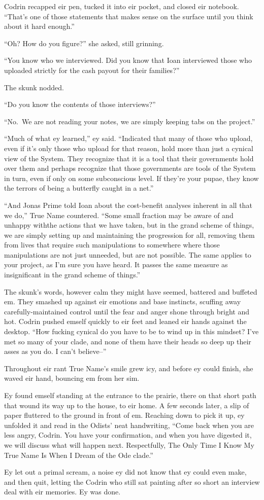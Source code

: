 Codrin recapped eir pen, tucked it into eir pocket, and closed eir notebook. ``That's one of those statements that makes sense on the surface until you think about it hard enough.''

``Oh? How do you figure?'' she asked, still grinning.

``You know who we interviewed. Did you know that Ioan interviewed those who uploaded strictly for the cash payout for their families?''

The skunk nodded.

``Do you know the contents of those interviews?''

``No.~We are not reading your notes, we are simply keeping tabs on the project.''

``Much of what ey learned,'' ey said. ``Indicated that many of those who upload, even if it's only those who upload for that reason, hold more than just a cynical view of the System. They recognize that it is a tool that their governments hold over them and perhaps recognize that those governments are tools of the System in turn, even if only on some subconscious level. If they're your pupae, they know the terrors of being a butterfly caught in a net.''

``And Jonas Prime told Ioan about the cost-benefit analyses inherent in all that we do,'' True Name countered. ``Some small fraction may be aware of and unhappy withthe actions that we have taken, but in the grand scheme of things, we are simply setting up and maintaining the progression for all, removing them from lives that require such manipulations to somewhere where those manipulations are not just unneeded, but are not possible. The same applies to your project, as I'm sure you have heard. It passes the same measure as insignificant in the grand scheme of things.''

The skunk's words, however calm they might have seemed, battered and buffeted em. They smashed up against eir emotions and base instincts, scuffing away carefully-maintained control until the fear and anger shone through bright and hot. Codrin pushed emself quickly to eir feet and leaned eir hands against the desktop. ``How fucking cynical do you have to be to wind up in this mindset? I've met so many of your clade, and none of them have their heads so deep up their asses as you do. I can't believe--''

Throughout eir rant True Name's smile grew icy, and before ey could finish, she waved eir hand, bouncing em from her sim.

Ey found emself standing at the entrance to the prairie, there on that short path that wound its way up to the house, to eir home. A few seconds later, a slip of paper fluttered to the ground in front of em. Reaching down to pick it up, ey unfolded it and read in the Odists' neat handwriting, ``Come back when you are less angry, Codrin. You have your confirmation, and when you have digested it, we will discuss what will happen next. Respectfully, The Only Time I Know My True Name Is When I Dream of the Ode clade.''

Ey let out a primal scream, a noise ey did not know that ey could even make, and then quit, letting the Codrin who still sat painting after so short an interview deal with eir memories. Ey was done.
